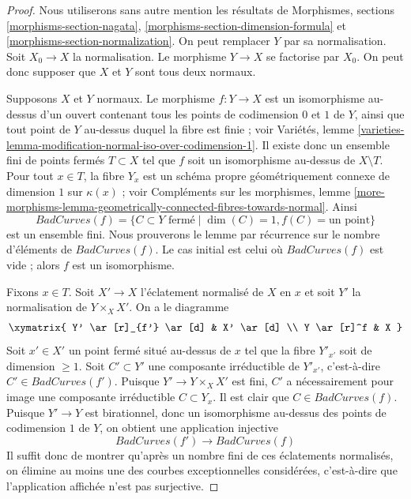 \begin{proof} Nous utiliserons sans autre mention les résultats de Morphismes, sections \ref{morphisms-section-nagata}, \ref{morphisms-section-dimension-formula} et \ref{morphisms-section-normalization}. On peut remplacer $Y$ par sa normalisation. Soit $X_0 \to X$ la normalisation. Le morphisme $Y \to X$ se factorise par $X_0$. On peut donc supposer que $X$ et $Y$ sont tous deux normaux.

\medskip\noindent Supposons $X$ et $Y$ normaux. Le morphisme $f : Y \to X$ est un isomorphisme au-dessus d'un ouvert contenant tous les points de codimension $0$ et $1$ de $Y$, ainsi que tout point de $Y$ au-dessus duquel la fibre est finie ; voir Variétés, lemme \ref{varieties-lemma-modification-normal-iso-over-codimension-1}. Il existe donc un ensemble fini de points fermés $T \subset X$ tel que $f$ soit un isomorphisme au-dessus de $X \setminus T$. Pour tout $x \in T$, la fibre $Y_x$ est un schéma propre géométriquement connexe de dimension $1$ sur $\kappa(x)$ ; voir Compléments sur les morphismes, lemme \ref{more-morphisms-lemma-geometrically-connected-fibres-towards-normal}. Ainsi $$
BadCurves(f) = \{C \subset Y\text{ fermé} \mid
\dim(C) = 1, f(C) = \text{un point}\}
$$ est un ensemble fini. Nous prouverons le lemme par récurrence sur le nombre d'éléments de $BadCurves(f)$. Le cas initial est celui où $BadCurves(f)$ est vide ; alors $f$ est un isomorphisme.

\medskip\noindent Fixons $x \in T$. Soit $X' \to X$ l'éclatement normalisé de $X$ en $x$ et soit $Y'$ la normalisation de $Y \times_X X'$. On a le diagramme $$
\xymatrix{
Y' \ar[r]_{f'} \ar[d] & X' \ar[d] \\
Y \ar[r]^f & X
}
$$ Soit $x' \in X'$ un point fermé situé au-dessus de $x$ tel que la fibre $Y'_{x'}$ soit de dimension $\geq 1$. Soit $C' \subset Y'$ une composante irréductible de $Y'_{x'}$, c'est-à-dire $C' \in BadCurves(f')$. Puisque $Y' \to Y \times_X X'$ est fini, $C'$ a nécessairement pour image une composante irréductible $C \subset Y_x$. Il est clair que $C \in BadCurves(f)$. Puisque $Y' \to Y$ est birationnel, donc un isomorphisme au-dessus des points de codimension $1$ de $Y$, on obtient une application injective $$
BadCurves(f') \longrightarrow BadCurves(f)
$$ Il suffit donc de montrer qu'après un nombre fini de ces éclatements normalisés, on élimine au moins une des courbes exceptionnelles considérées, c'est-à-dire que l'application affichée n'est pas surjective.


\end{proof}
